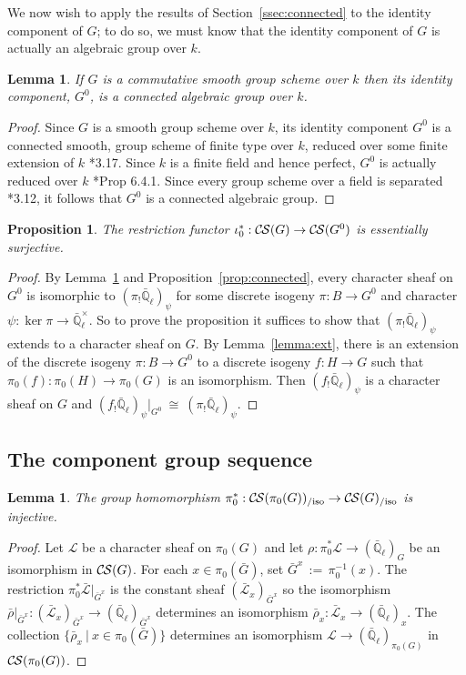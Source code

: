 \documentclass[10pt]{amsart}
\theoremstyle{plain}
\newtheorem{proposition}[theorem]{Proposition}
\newtheorem{lemma}[theorem]{Lemma}
\theoremstyle{definition}
\theoremstyle{remark}
\newcommand{\EE}{\mathbb{\bar Q}_\ell}
\newcommand{\Fq}{k}
\newcommand{\EEx}{\EE^\times}
\newcommand{\ceq}{{\, :=\, }}
\newcommand{\tq}{{\ \vert\ }}
\newcommand{\iso}{{\ \cong\ }}
\newcommand{\cs}[1]{{\mathcal{#1}}}
\newcommand{\gcs}[1]{{\mathcal{\bar #1}}}
\newcommand{\CS}{{\mathcal{C\hskip-0.8pt S}}}
\newcommand{\CSiso}[1]{\CS(#1)_{/\text{iso}}}
\newcommand{\bG}{\bar{G}}
\newcommand{\brho}{{\bar\rho}}
\begin{document}
We now wish to apply the results of Section~\ref{ssec:connected} to the identity component of $G$; to do so, we must know that the identity component of $G$ is actually an algebraic group over $\Fq$.

\begin{lemma} \label{lem:G0alg-grp}
If $G$ is a commutative smooth group scheme over $\Fq$ then its identity component, $G^0$, is a connected algebraic group over $\Fq$.
\end{lemma}
\begin{proof}
 Since $G$ is a smooth group scheme over $\Fq$, its
 identity component $G^0$ is a connected smooth,
 group scheme of finite type over $\Fq$, reduced over some finite extension of $\Fq$
 \cite{vdGeer-Moonen:AbelianVarieties}*{3.17}.
 Since $\Fq$ is a finite field and hence perfect, $G^0$ is actually reduced over $\Fq$
 \cite{EGAIV2}*{Prop 6.4.1}.  Since every group scheme over a field is separated
 \cite{vdGeer-Moonen:AbelianVarieties}*{3.12},
 it follows that $G^0$ is a connected algebraic group.
\end{proof}

\begin{proposition}\label{prop:restriction}
The restriction functor $\iota_0^* : \CS(G)\to \CS(G^0)$ is essentially surjective.
\end{proposition}

\begin{proof}
  By Lemma~\ref{lem:G0alg-grp} and Proposition~\ref{prop:connected}, every
  character sheaf on $G^0$ is isomorphic to $(\pi_! \EE)_\psi$ for some discrete isogeny $\pi : B \to G^0$ and character $\psi : \ker \pi \to \EEx$.
  So to prove the proposition it suffices to show that $(\pi_! \EE)_\psi$ extends to a character sheaf on $G$.
%
 By Lemma~\ref{lemma:ext}, there is an extension of the
 discrete isogeny $\pi : B \to G^0$ to a discrete isogeny $f : H \to G$
 such that $\pi_0(f) : \pi_0(H)\to \pi_0(G)$ is an isomorphism.
 Then $(f_! \EE)_\psi$ is a character sheaf on $G$ and
 $(f_! \EE)_\psi\vert_{G^0} \iso (\pi_! \EE)_\psi$.
\end{proof}

\subsection{The component group sequence} \label{ssec:component}

\begin{lemma}\label{lem:extension}
The group homomorphism $\pi_0^*: \CSiso{\pi_0(G)} \to \CSiso{G}$ is injective.
\end{lemma}
\begin{proof}
Let $\cs{L}$ be a character sheaf on $\pi_0(G)$ and let $\rho : \pi_0^*\cs{L} \to (\EE)_{G}$ be an isomorphism in $\CS(G)$. 
For each $x\in \pi_0(\bG)$, set $\bG^x \ceq \pi_0^{-1}(x)$.
The restriction $\pi_0^*\gcs{L}\vert_{\bG^x}$ is the constant sheaf $(\gcs{L}_x)_{\bG^x}$ so the isomorphism $\brho\vert_{\bG^x} : (\gcs{L}_x)_{\bG^x} \to (\EE)_{\bG^x}$ determines an isomorphism $\brho_x : \gcs{L}_x \to (\EE)_x$. The collection $\{ \brho_x \tq x\in \pi_0(\bG) \}$ determines an isomorphism $\cs{L} \to (\EE)_{\pi_0(G)}$  in $\CS(\pi_0(G))$.
\end{proof}
\end{document}
